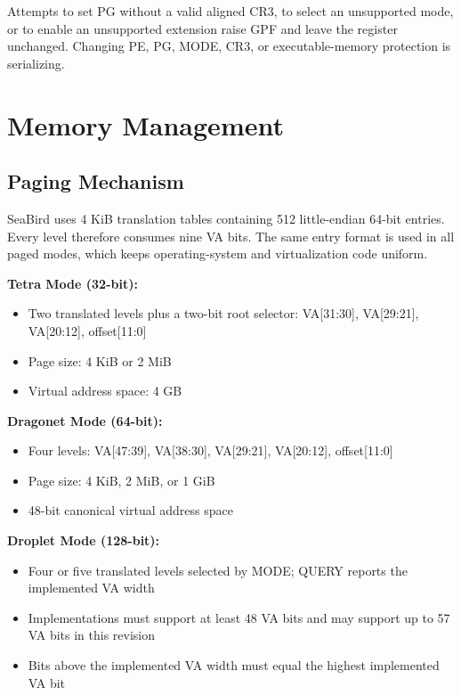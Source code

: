 \documentclass[11pt]{article}
\begin{document}
Attempts to set PG without a valid aligned CR3, to select an unsupported mode, or to enable an unsupported extension raise GPF and leave the register unchanged. Changing PE, PG, MODE, CR3, or executable-memory protection is serializing.

\section{Memory Management}

\subsection{Paging Mechanism}

SeaBird uses 4 KiB translation tables containing 512 little-endian 64-bit entries. Every level therefore consumes nine VA bits. The same entry format is used in all paged modes, which keeps operating-system and virtualization code uniform.

\thispagestyle{fancy}
\textbf{Tetra Mode (32-bit):}
\begin{itemize}
    \item Two translated levels plus a two-bit root selector: VA[31:30], VA[29:21], VA[20:12], offset[11:0]
    \item Page size: 4 KiB or 2 MiB
    \item Virtual address space: 4 GB
\end{itemize}

\textbf{Dragonet Mode (64-bit):}
\begin{itemize}
    \item Four levels: VA[47:39], VA[38:30], VA[29:21], VA[20:12], offset[11:0]
    \item Page size: 4 KiB, 2 MiB, or 1 GiB
    \item 48-bit canonical virtual address space
\end{itemize}

\textbf{Droplet Mode (128-bit):}
\begin{itemize}
    \item Four or five translated levels selected by MODE; QUERY reports the implemented VA width
    \item Implementations must support at least 48 VA bits and may support up to 57 VA bits in this revision
    \item Bits above the implemented VA width must equal the highest implemented VA bit
\end{itemize}
\end{document}
